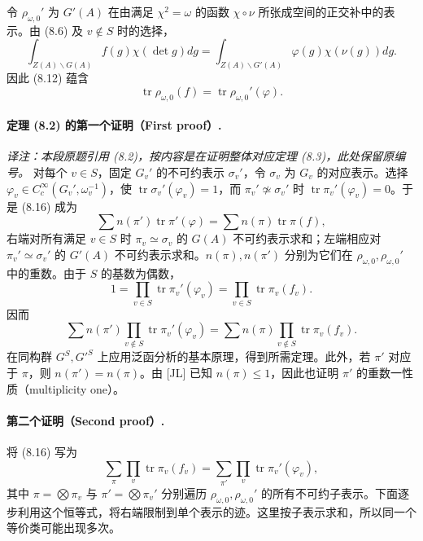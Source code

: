 令 $\rho_{\omega,0}'$ 为 $G'(A)$ 在由满足 $\chi^2=\omega$ 的函数 $\chi\circ\nu$ 所张成空间的正交补中的表示。由 (8.6) 及 $v\notin S$ 时的选择，
\[
 \int_{Z(A)\backslash G(A)}f(g)\chi(\det g)dg
 =\int_{Z(A)\backslash G'(A)}\varphi(g)\chi(\nu(g))dg.
\]
因此 (8.12) 蕴含
\begin{equation}
 \operatorname{tr}\rho_{\omega,0}(f)=\operatorname{tr}\rho_{\omega,0}'(\varphi).\tag{8.16}
\end{equation}

\paragraph*{定理 (8.2) 的第一个证明（First proof）.}
\textit{译注：本段原题引用 (8.2)，按内容是在证明整体对应定理 (8.3)，此处保留原编号。}
对每个 $v\in S$，固定 $G_v'$ 的不可约表示 $\sigma_v'$，令 $\sigma_v$ 为 $G_v$ 的对应表示。选择
$\varphi_v\in C_c^\infty(G_v',\omega_v^{-1})$，使
$\operatorname{tr}\sigma_v'(\varphi_v)=1$，而 $\pi_v'\not\simeq\sigma_v'$ 时
$\operatorname{tr}\pi_v'(\varphi_v)=0$。于是 (8.16) 成为
\[
 \sum n(\pi')\operatorname{tr}\pi'(\varphi)
 =\sum n(\pi)\operatorname{tr}\pi(f),
\]
右端对所有满足 $v\in S$ 时 $\pi_v\simeq\sigma_v$ 的 $G(A)$ 不可约表示求和；左端相应对
$\pi_v'\simeq\sigma_v'$ 的 $G'(A)$ 不可约表示求和。$n(\pi),n(\pi')$ 分别为它们在
$\rho_{\omega,0},\rho_{\omega,0}'$ 中的重数。由于 $S$ 的基数为偶数，
\[
 1=\prod_{v\in S}\operatorname{tr}\pi_v'(\varphi_v)
 =\prod_{v\in S}\operatorname{tr}\pi_v(f_v).
\]
因而
\[
 \sum n(\pi')\prod_{v\notin S}\operatorname{tr}\pi_v'(\varphi_v)
 =\sum n(\pi)\prod_{v\notin S}\operatorname{tr}\pi_v(f_v).
\]
在同构群 $G^S,G'^S$ 上应用泛函分析的基本原理，得到所需定理。此外，若 $\pi'$ 对应于
$\pi$，则 $n(\pi')=n(\pi)$。由 [JL] 已知 $n(\pi)\le1$，因此也证明 $\pi'$ 的重数一性质（multiplicity one）。

\paragraph*{第二个证明（Second proof）.}
将 (8.16) 写为
\begin{equation}
 \sum_\pi\prod_v\operatorname{tr}\pi_v(f_v)
 =\sum_{\pi'}\prod_v\operatorname{tr}\pi_v'(\varphi_v),\tag{8.17}
\end{equation}
其中 $\pi=\bigotimes\pi_v$ 与 $\pi'=\bigotimes\pi_v'$ 分别遍历
$\rho_{\omega,0},\rho_{\omega,0}'$ 的所有不可约子表示。下面逐步利用这个恒等式，将右端限制到单个表示的迹。这里按子表示求和，所以同一个等价类可能出现多次。

